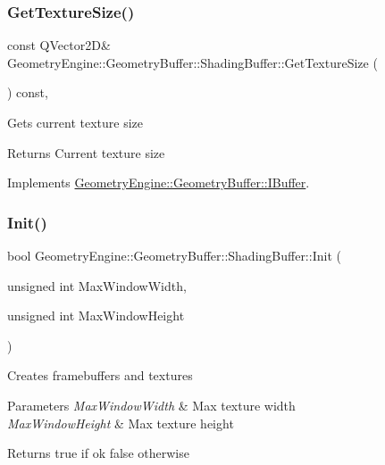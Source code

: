 \subsubsection{\texorpdfstring{GetTextureSize()}{GetTextureSize()}}
{\footnotesize\ttfamily const Q\+Vector2D\& Geometry\+Engine\+::\+Geometry\+Buffer\+::\+Shading\+Buffer\+::\+Get\+Texture\+Size (\begin{DoxyParamCaption}{ }\end{DoxyParamCaption}) const\hspace{0.3cm}{\ttfamily [inline]}, {\ttfamily [virtual]}}

Gets current texture size \begin{DoxyReturn}{Returns}
Current texture size 
\end{DoxyReturn}


Implements \mbox{\hyperlink{class_geometry_engine_1_1_geometry_buffer_1_1_i_buffer_af7546a1b668af70daa255747df92181d}{Geometry\+Engine\+::\+Geometry\+Buffer\+::\+I\+Buffer}}.

\mbox{\label{class_geometry_engine_1_1_geometry_buffer_1_1_shading_buffer_af1fdd3ca773dce41a4fbe4bec2df12fa}} 
\subsubsection{\texorpdfstring{Init()}{Init()}}
{\footnotesize\ttfamily bool Geometry\+Engine\+::\+Geometry\+Buffer\+::\+Shading\+Buffer\+::\+Init (\begin{DoxyParamCaption}\item[{unsigned int}]{Max\+Window\+Width,  }\item[{unsigned int}]{Max\+Window\+Height }\end{DoxyParamCaption})\hspace{0.3cm}{\ttfamily [virtual]}}

Creates framebuffers and textures 
\begin{DoxyParams}{Parameters}
{\em Max\+Window\+Width} & Max texture width \\
\hline
{\em Max\+Window\+Height} & Max texture height \\
\hline
\end{DoxyParams}
\begin{DoxyReturn}{Returns}
true if ok false otherwise 
\end{DoxyReturn}


